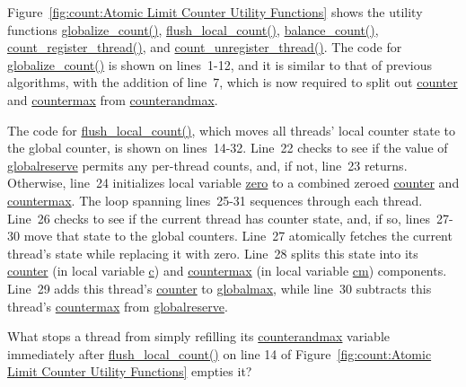 Figure~\ref{fig:count:Atomic Limit Counter Utility Functions}
shows the utility functions
\url{globalize_count()},
\url{flush_local_count()},
\url{balance_count()},
\url{count_register_thread()}, and
\url{count_unregister_thread()}.
The code for \url{globalize_count()} is shown on lines~1-12, and
it is similar to that of previous algorithms, with the addition of
line~7, which is now required to split out \url{counter} and
\url{countermax} from \url{counterandmax}.

The code for \url{flush_local_count()}, which moves all threads' local
counter state to the global counter, is shown on lines~14-32.
Line~22 checks to see if the value of \url{globalreserve} permits
any per-thread counts, and, if not, line~23 returns.
Otherwise, line~24 initializes local variable \url{zero} to a combined
zeroed \url{counter} and \url{countermax}.
The loop spanning lines~25-31 sequences through each thread.
Line~26 checks to see if the current thread has counter state,
and, if so, lines~27-30 move that state to the global counters.
Line~27 atomically fetches the current thread's state
while replacing it with zero.
Line~28 splits this state into its \url{counter} (in local variable \url{c})
and \url{countermax} (in local variable \url{cm}) components.
Line~29 adds this thread's \url{counter} to \url{globalmax}, while
line~30 subtracts this thread's \url{countermax} from \url{globalreserve}.

\QuickQuiz{}
	What stops a thread from simply refilling its
	\url{counterandmax} variable immediately after
	\url{flush_local_count()} on line 14 of
	Figure~\ref{fig:count:Atomic Limit Counter Utility Functions}
	empties it?
 \QuickQuizEnd


